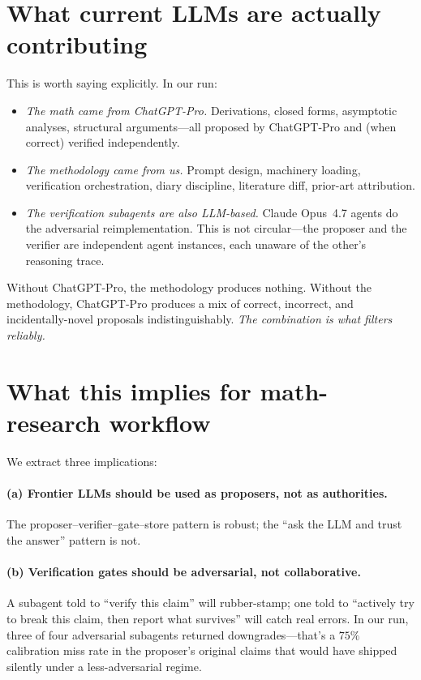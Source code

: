 \documentclass[11pt,reqno]{amsart}
\theoremstyle{definition}
\begin{document}
\section{What current LLMs are actually contributing}\label{sec:contributions}

This is worth saying explicitly. In our run:

\begin{itemize}[leftmargin=2em]
\item \emph{The math came from ChatGPT-Pro.} Derivations, closed
forms, asymptotic analyses, structural arguments---all proposed by
ChatGPT-Pro and (when correct) verified independently.
\item \emph{The methodology came from us.} Prompt design, machinery
loading, verification orchestration, diary discipline, literature
diff, prior-art attribution.
\item \emph{The verification subagents are also LLM-based.} Claude
Opus~4.7 agents do the adversarial reimplementation. This is not
circular---the proposer and the verifier are independent agent
instances, each unaware of the other's reasoning trace.
\end{itemize}

Without ChatGPT-Pro, the methodology produces nothing. Without the
methodology, ChatGPT-Pro produces a mix of correct, incorrect, and
incidentally-novel proposals indistinguishably. \emph{The combination
is what filters reliably.}

\section{What this implies for math-research workflow}\label{sec:implications}

We extract three implications:

\paragraph{(a) Frontier LLMs should be used as proposers, not as
authorities.}
The proposer--verifier--gate--store pattern is robust; the ``ask the
LLM and trust the answer'' pattern is not.

\paragraph{(b) Verification gates should be adversarial, not
collaborative.}
A subagent told to ``verify this claim'' will rubber-stamp; one told
to ``actively try to break this claim, then report what survives''
will catch real errors. In our run, three of four adversarial
subagents returned downgrades---that's a $75\%$ calibration miss
rate in the proposer's original claims that would have shipped
silently under a less-adversarial regime.
\end{document}
